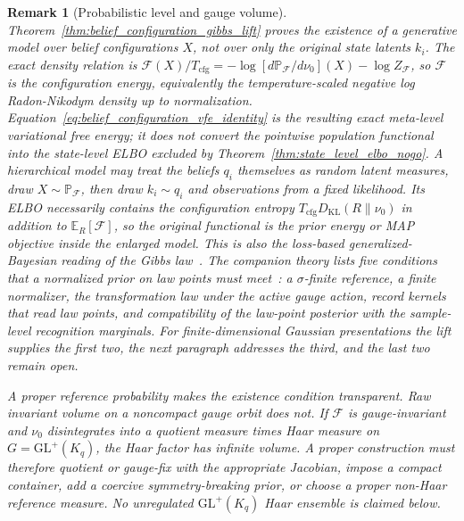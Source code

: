 \documentclass[11pt]{article}
\newtheorem{remark}{Remark}
\begin{document}
\begin{remark}[Probabilistic level and gauge volume]
\label{rem:gibbs_lift_interpretation}
Theorem~\ref{thm:belief_configuration_gibbs_lift} proves the existence of a generative model over belief configurations $X$, not over only the original state latents $k_i$. The exact density relation is $\mathcal{F}(X)/T_{\mathrm{cfg}}=-\log[d\mathbb{P}_{\mathcal{F}}/d\nu_0](X)-\log Z_{\mathcal{F}}$, so $\mathcal{F}$ is the configuration energy, equivalently the temperature-scaled negative log Radon-Nikodym density up to normalization. Equation~\eqref{eq:belief_configuration_vfe_identity} is the resulting exact meta-level variational free energy; it does not convert the pointwise population functional into the state-level ELBO excluded by Theorem~\ref{thm:state_level_elbo_nogo}. A hierarchical model may treat the beliefs $q_i$ themselves as random latent measures, draw $X\sim\mathbb{P}_{\mathcal{F}}$, then draw $k_i\sim q_i$ and observations from a fixed likelihood. Its ELBO necessarily contains the configuration entropy $T_{\mathrm{cfg}}D_{\mathrm{KL}}(R\|\nu_0)$ in addition to $\mathbb{E}_R[\mathcal{F}]$, so the original functional is the prior energy or MAP objective inside the enlarged model. This is also the loss-based generalized-Bayesian reading of the Gibbs law~\cite{BissiriHolmesWalker2016}. The companion theory lists five conditions that a normalized prior on law points must meet~\cite[Ch.~3]{DennisGaugeVFE2026}: a $\sigma$-finite reference, a finite normalizer, the transformation law under the active gauge action, record kernels that read law points, and compatibility of the law-point posterior with the sample-level recognition marginals. For finite-dimensional Gaussian presentations the lift supplies the first two, the next paragraph addresses the third, and the last two remain open.

A proper reference probability makes the existence condition transparent. Raw invariant volume on a noncompact gauge orbit does not. If $\mathcal{F}$ is gauge-invariant and $\nu_0$ disintegrates into a quotient measure times Haar measure on $G=\mathrm{GL}^+(K_q)$, the Haar factor has infinite volume. A proper construction must therefore quotient or gauge-fix with the appropriate Jacobian, impose a compact container, add a coercive symmetry-breaking prior, or choose a proper non-Haar reference measure. No unregulated $\mathrm{GL}^+(K_q)$ Haar ensemble is claimed below.
\end{remark}
\end{document}
